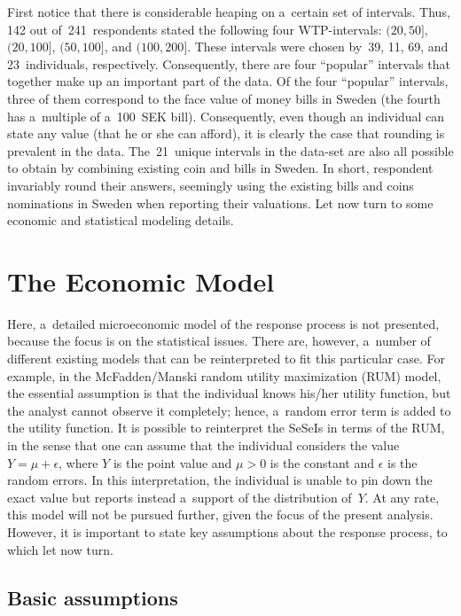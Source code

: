 \begin{multicols}{2}
First notice that  there is considerable heaping on a~certain set of intervals.
Thus, 142 out of~241~respondents stated the following four WTP-in\-ter\-vals: 
$(20, 50]$, $(20, 100]$, $(50, 100]$, and $(100, 200]$. 
These intervals were chosen by~39, 11, 69, and 23~individuals, respectively. Consequently,
there are four ``popular'' intervals that together make up an important part of the data. Of the four
``popular'' intervals, three of them correspond to the face value of money bills in Sweden (the fourth
has a~multiple of a~100~SEK bill). Consequently, even though an individual can state any value
(that he or she can afford), it is clearly the case that rounding is prevalent in the data.
The~21~unique intervals in the data-set are also all possible to obtain by combining existing
coin and bills in Sweden. In short, respondent invariably round their answers, seemingly using
the existing bills and coins nominations in Sweden when reporting their valuations. Let now turn
to some economic and statistical modeling details.

\section{The Economic Model} %

\noindent
Here, a~detailed microeconomic model of the response process
is not presented, because the focus is on
the statistical issues. There are, however, a~number of different existing models that 
can be reinterpreted to fit this particular case. For example, in the McFadden/Manski random utility
maximization (RUM) mo\-del, the essential assumption is that the individual knows 
his/her utility function,
but the analyst cannot observe it completely; hence,
a~random error term is added to the utility function.
It is possible to reinterpret the SeSeIs in terms of the RUM, in the sense that one can assume that
the individual considers the value $Y=\mu + \epsilon$, where $Y$ is the point value 
and $\mu >0$ is the constant and $\epsilon$ is the random errors. In this interpretation, the individual is unable to pin
down the exact value but reports instead a~support of the distribution of~$Y$. 
At any rate,
 this model will not be pursued further, given the focus of the
 present analysis. However, it is important
 to state key assumptions about the response process, to which let now turn.

\subsection*{Basic assumptions}


\end{multicols}

